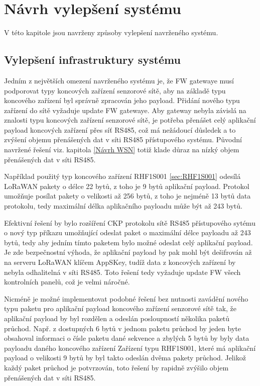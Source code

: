\chapter{Návrh vylepšení systému}
V této kapitole jsou navrženy způsoby vylepšení navrženého systému.


\section{Vylepšení infrastruktury systému}
Jedním z největších omezení navrženého systému je, že FW gatewaye musí podporovat typy koncových zařízení senzorové sítě, aby na základě typu koncového zařízení byl správně zpracován jeho payload.
Přidání nového typu zařízení do sítě vyžaduje update FW gatewaye.
Aby gateway nebyla závislá na znalosti typu koncových zařízení senzorové sítě, je potřeba přenášet celý aplikační payload koncových zařízení přes síť RS485, což má nežádoucí důsledek a to zvýšení objemu přenášených dat v síti RS485 přístupového systému.
Původní navržené řešení viz. kapitola \ref{Návrh WSN} totiž klade důraz na nízký objem přenášených dat v síti RS485.

Například použitý typ koncového zařízení RHF1S001 \ref{sec:RHF1S001} odesílá LoRaWAN pakety o délce 22 bytů, z toho je 9 bytů aplikační payload. Protokol umožňuje posílat pakety o velikosti až 256 bytů, z toho je nejméně 13 bytů data protokolu, tedy maximální délka aplikačního payloadu může být až 243 bytů.

Efektivní řešení by bylo rozšíření CKP protokolu sítě RS485 přístupového sytému o nový typ příkazu umožňující odeslat paket o maximální délce payloadu až 243 bytů, tedy aby jedním tímto paketem bylo možné odeslat celý aplikační payload. 
Je zde bezpečnostní výhoda, že aplikační payload by pak mohl být dešifrován až na serveru LoRaWAN klíčem AppSKey, tudíž data z koncových zařízení by nebyla odhalitelná v síti RS485.
Toto řešení tedy vyžaduje update FW všech kontrolních panelů, což je velmi náročné.

Nicméně je možné implementovat podobné řešení bez nutnosti zavádění nového typu paketu pro aplikační payload koncového zařízení senzorové sítě tak, že aplikační payload by byl rozdělen a odeslán posloupností několika paketů průchod. 
Např. z dostupných 6 bytů v jednom paketu průchod by jeden byte obsahoval informaci o čísle paketu dané sekvence a zbylých 5 bytů by byly data payloadu daného koncového zařízení Zařízení typu RHF1S001, které má aplikační payload o velikosti 9 bytů by byl takto odeslán dvěma pakety průchod. Jelikož každý paket průchod je potvrzován, toto řešení by rapidně zvýšilo objem přenášených dat v síti RS485.



